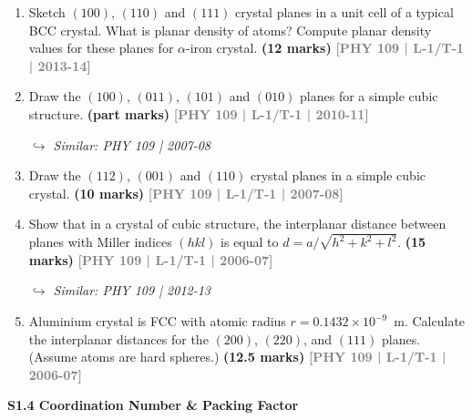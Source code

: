 \documentclass[12pt,a3paper]{article}
\newcommand{\yr}[1]{\hfill\textcolor{gray}{\small\textbf{[#1]}}}
\newcommand{\mk}[1]{\textcolor{orange!70!black}{\small\textbf{(#1 marks)}}}
\newcommand{\variant}[1]{\par\vspace{1pt}\textcolor{blue!50!black}%
  {\footnotesize\textit{$\hookrightarrow$ Similar: #1}}}
\newcommand{\subtopic}[2]{%
  \vspace{10pt}
  \noindent\begin{tcolorbox}[colback=#1!8,colframe=#1,boxrule=0.6pt,arc=4pt,
    left=6pt,right=6pt,top=4pt,bottom=4pt]
    \small\bfseries\textcolor{#1}{#2}
  \end{tcolorbox}
  \vspace{2pt}
}
\begin{document}
\begin{enumerate}
\item Sketch $(100)$, $(110)$ and $(111)$ crystal planes in a unit cell of a typical BCC crystal. What is planar density of atoms? Compute planar density values for these planes for $\alpha$-iron crystal.
\mk{12} \yr{PHY 109 | L-1/T-1 | 2013-14}

\item Draw the $(100)$, $(011)$, $(101)$ and $(010)$ planes for a simple cubic structure.
\mk{part} \yr{PHY 109 | L-1/T-1 | 2010-11}
\variant{PHY 109 | 2007-08}

\item Draw the $(112)$, $(001)$ and $(110)$ crystal planes in a simple cubic crystal.
\mk{10} \yr{PHY 109 | L-1/T-1 | 2007-08}

\item Show that in a crystal of cubic structure, the interplanar distance between planes with Miller indices $(hkl)$ is equal to $d = a/\sqrt{h^2+k^2+l^2}$.
\mk{15} \yr{PHY 109 | L-1/T-1 | 2006-07}
\variant{PHY 109 | 2012-13}

\item Aluminium crystal is FCC with atomic radius $r = 0.1432\times10^{-9}$~m. Calculate the interplanar distances for the $(200)$, $(220)$, and $(111)$ planes. (Assume atoms are hard spheres.)
\mk{12.5} \yr{PHY 109 | L-1/T-1 | 2006-07}

\end{enumerate}

\label{sec:s14}
\subtopic{cA}{S1.4 \quad Coordination Number \& Packing Factor}
\end{document}

